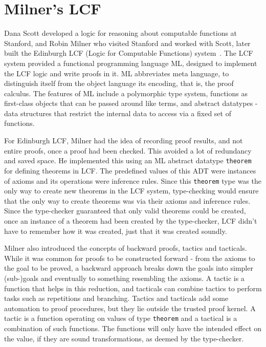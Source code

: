\documentclass{article}
\begin{document}
\section{Milner's LCF}
\label{sec:lcf}
	Dana Scott developed a logic for 
	reasoning about computable functions at 
	Stanford, and Robin Milner who visited 
	Stanford and worked with Scott, 
	later built the Edinburgh LCF
	(Logic for Computable Functions) 
	system~\cite{Gordon1978EdinburghLA}.
	The LCF system provided a functional 
	programming language ML, designed to 
	implement the LCF logic and write proofs 
	in it. ML abbreviates meta language, 
	to distinguish itself from the object 
	language its encoding, that is, the 
	proof calculus. The features of ML 
	include a polymorphic type system, 
	functions as first-class objects 
	that can be passed around like terms, 
	and abstract datatypes - data 
	structures that restrict the internal 
	data to access via a fixed set of 
	functions. 
	
	For Edinburgh LCF,
	Milner had the idea of recording proof
	results, and not entire proofs, once a 
	proof had been checked. This avoided a 
	lot of redundancy and saved space.
	He implemented this using 
	an ML abstract datatype \texttt{theorem} 
	for defining theorems in LCF. The 
	predefined values of this ADT were 
	instances of axioms and its operations 
	were inference rules. Since this 
	\texttt{theorem} type was the only
	way to create new theorems in the LCF 
	system, type-checking would ensure that 
	the only way to create theorems 
	was via their axioms and inference 
	rules. Since the type-checker guaranteed
	that only valid theorems could be 
	created, once an instance of a theorem 
	had been created by the type-checker, 
	LCF didn't have to remember how it 
	was created, just that it was created 
	soundly. 
	
	Milner also introduced the concepts of 
	backward proofs, tactics and tacticals.
	While it was common for proofs to be 
	constructed forward - from the axioms 
	to the goal to be proved, a backward 
	approach breaks down the goals into 
	simpler (sub-)goals and eventually 
	to something resembling the axioms. A
	tactic is a function that helps in 
	this reduction, and tacticals can 
	combine tactics to perform tasks 
	such as repetitions and branching. 
	Tactics and tacticals add some 
	automation to proof procedures, but 
	they lie outside the trusted proof 
	kernel. A tactic is a function 
	operating on values of type 
	\texttt{theorem} and a tactical 
	is a combination of such functions. 
	The functions will only have the 
	intended effect on the value, if 
	they are sound transformations, 
	as deemed by the type-checker.
	
\end{document}
